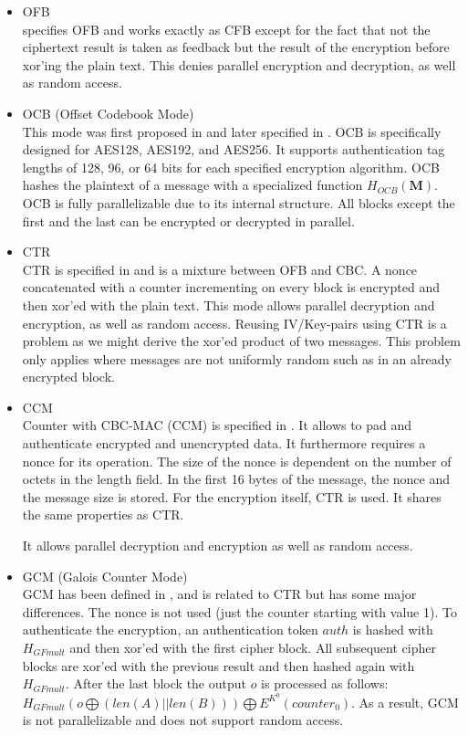 \begin{itemize}
	\item OFB\\
	\cite{dworkin2001recommendation} specifies OFB and works exactly as CFB except for the fact that not the ciphertext result is taken as feedback but the result of the encryption before xor'ing the plain text. This denies parallel encryption and decryption, as well as random access.
	\item OCB (Offset Codebook Mode)\\
	This mode was first proposed in \cite{rogaway2003ocb} and later specified in \cite{krovetz-ocb-04}. OCB is specifically designed for AES128, AES192, and AES256. It supports authentication tag lengths of 128, 96, or 64 bits for each specified encryption algorithm. OCB hashes the plaintext of a message with a specialized function $H_{OCB}(\mathbf{M})$. OCB is fully parallelizable due to its internal structure. All blocks except the first and the last can be encrypted or decrypted in parallel.
	\item CTR\\
	CTR is specified in \cite{lipmaa2000ctr} and is a mixture between OFB and CBC. A nonce concatenated with a counter incrementing on every block is encrypted and then xor'ed with the plain text. This mode allows parallel decryption and encryption, as well as random access. Reusing IV/Key-pairs using CTR is a problem as we might derive the xor'ed product of two messages. This problem only applies where messages are not uniformly random such as in an already encrypted block.
	\item CCM\\
	Counter with CBC-MAC (CCM) is specified in \cite{RFC3610}. It allows to pad and authenticate encrypted and unencrypted data. It furthermore requires a nonce for its operation. The size of the nonce is dependent on the number of octets in the length field. In the first 16 bytes of the message, the nonce and the message size is stored. For the encryption itself, CTR is used. It shares the same properties as CTR. 
	
	It allows parallel decryption and encryption as well as random access.
	\item GCM (Galois Counter Mode)\\
	GCM has been defined in \cite{mcgrew2004galois}, and is related to CTR but has some major differences. The nonce is not used (just the counter starting with value 1). To authenticate the encryption, an authentication token $auth$ is hashed with $H_{GFmult}$ and then xor'ed with the first cipher block. All subsequent cipher blocks are xor'ed with the previous result and then hashed again with $H_{GFmult}$. After the last block the output $o$ is processed  as follows: $H_{GFmult}(o\bigoplus (len(A)||len(B))) \bigoplus E^{K^0}(counter_0)$. As a result, GCM is not parallelizable and does not support random access.
	

\end{itemize}
